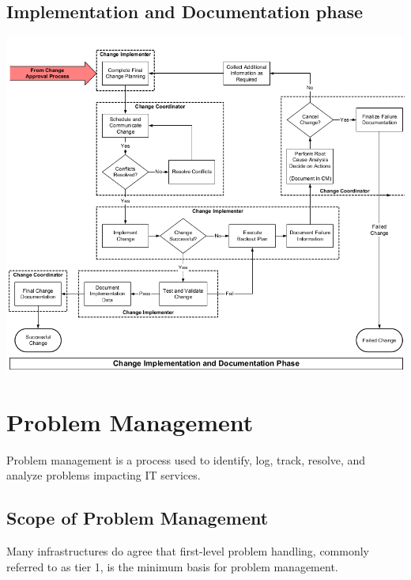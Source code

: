 \documentclass[a4]{article}
\begin{document}
\begin{multicols}{3}
\subsection{Implementation and Documentation phase}
\begin{center}
    \begin{minipage}{\columnwidth}
        \includegraphics[width=\columnwidth]{change-implementation-documentation-phase.png}
    \end{minipage}
\end{center}



\section{Problem Management}
Problem management is a process used to identify, log, track, resolve, and analyze problems impacting IT services.

\subsection{Scope of Problem Management}
Many infrastructures do agree that first-level problem handling, commonly referred to as tier 1,
 is the minimum basis for problem management.


\end{multicols}
\end{document}
